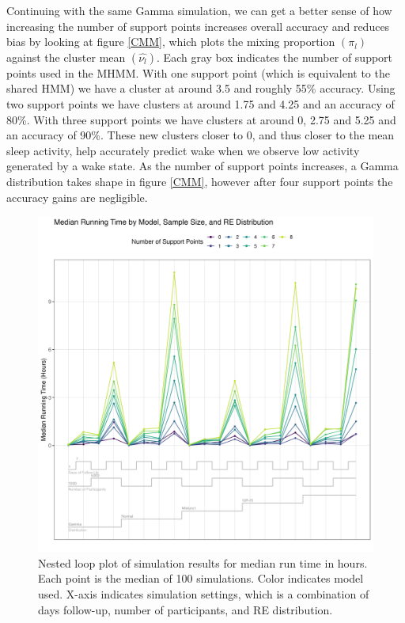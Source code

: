 \documentclass[num-refs]{wiley-article}
\begin{document}
Continuing with the same Gamma simulation, we can get a better sense of how increasing the number of support points increases overall accuracy and reduces bias by looking at figure \ref{CMM}, which plots the mixing proportion $(\pi_l)$ against the cluster mean $(\hat{\nu_l})$. Each gray box indicates the number of support points used in the MHMM. With one support point (which is equivalent to the shared HMM) we have a cluster at around 3.5 and roughly 55\% accuracy. Using two support points we have clusters at around 1.75 and 4.25 and an accuracy of 80\%. With three support points we have clusters at around 0, 2.75 and 5.25 and an accuracy of 90\%. These new clusters closer to 0, and thus closer to the mean sleep activity, help accurately predict wake when we observe low activity generated by a wake state. As the number of support points increases, a Gamma distribution takes shape in figure \ref{CMM}, however after four support points the accuracy gains are negligible.

\begin{figure}
\includegraphics[scale=.4]{Support/NestedLoopCompTime.png}
\centering
\caption{Nested loop plot of simulation results for median run time in hours. Each point is the median of 100 simulations. Color indicates model used. X-axis indicates simulation settings, which is a combination of days follow-up, number of participants, and RE distribution.}
\label{time}
\end{figure}
\end{document}
